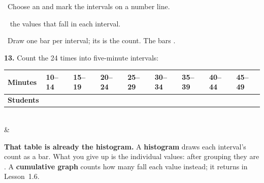 \documentclass[12pt]{article}
\begin{document}
\begin{guidednotes}
\vspace{3pt}
\ Choose an  and mark the intervals on a number line.\par
{}\  the values that fall in each interval.\par
{}\ Draw one bar per interval; its  is the count. The bars .

\vspace{4pt}
\textbf{13.} Count the 24 times into five-minute intervals:

\vspace{2pt}
\footnotesize\setlength{\tabcolsep}{2pt}%
\renewcommand{\arraystretch}{1.25}
\begin{tabularx}{\linewidth}{@{} l Y Y Y Y Y Y Y Y @{}}
\textbf{Minutes} & 10--14 & 15--19 & 20--24 & 25--29 & 30--34 & 35--39 & 40--44 & 45--49 \\
\hline
\textbf{Students} &  &  &  &  &
 &  &  &  \\
\end{tabularx}\small
\\
& \begin{minipage}[c]{0.42\linewidth}
\centering
{}
\end{minipage}\hfill
\begin{minipage}[c]{0.55\linewidth}\raggedright
\textbf{That table is already the histogram.} A \textbf{histogram} draws each interval's count
as a bar. What you give up is the individual values: after grouping they are .
A \textbf{cumulative graph} counts how many fall  each value instead; it
returns in Lesson~1.6.
\end{minipage}

\end{guidednotes}
\end{document}
